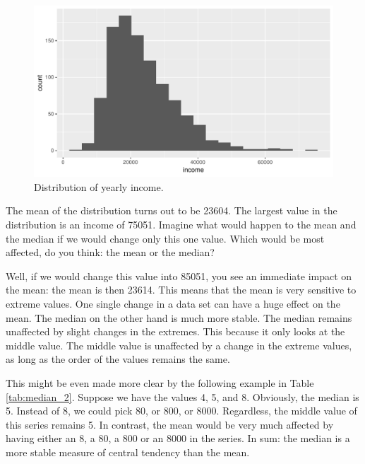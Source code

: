 \documentclass[]{book}\usepackage[]{graphicx}\usepackage[]{color}
\makeatletter
\def\maxwidth{ %
  \ifdim\Gin@nat@width>\linewidth
    \linewidth
  \else
    \Gin@nat@width
  \fi
}
\makeatother
\begin{document}
\begin{figure}

{\centering \includegraphics[width=\maxwidth]{figure/median-1} 

}

\caption[Distribution of yearly income]{Distribution of yearly income.}\label{fig:median}
\end{figure}



The mean of the distribution turns out to be 23604. The largest value in the distribution is an income of 75051. Imagine what would happen to the mean and the median if we would change only this one value. Which would be most affected, do you think: the mean or the median?



Well, if we would change this value into 85051, you see an immediate impact on the mean: the mean is then 23614. This means that the mean is very sensitive to extreme values. One single change in a data set can have a huge effect on the mean. The median on the other hand is much more stable. The median remains unaffected by slight changes in the extremes. This because it only looks at the middle value. The middle value is unaffected by a change in the extreme values, as long as the order of the values remains the same.

This might be even made more clear by the following example in Table \ref{tab:median_2}. Suppose we have the values 4, 5, and 8. Obviously, the median is 5. Instead of 8, we could pick 80, or 800, or 8000. Regardless, the middle value of this series remains 5. In contrast, the mean would be very much affected by having either an 8, a 80, a 800 or an 8000 in the series. In sum: the median is a more stable measure of central tendency than the mean.
\end{document}
